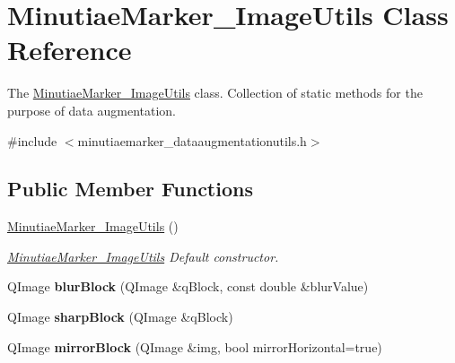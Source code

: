 \hypertarget{class_minutiae_marker___image_utils}{}\section{Minutiae\+Marker\+\_\+\+Image\+Utils Class Reference}
\label{class_minutiae_marker___image_utils}


The \mbox{\hyperlink{class_minutiae_marker___image_utils}{Minutiae\+Marker\+\_\+\+Image\+Utils}} class. Collection of static methods for the purpose of data augmentation.  




{\ttfamily \#include $<$minutiaemarker\+\_\+dataaugmentationutils.\+h$>$}

\subsection*{Public Member Functions}
\begin{DoxyCompactItemize}
\item 
\mbox{\label{class_minutiae_marker___image_utils_af13dada2f7014768d5d361371a8082f7}} 
\mbox{\hyperlink{class_minutiae_marker___image_utils_af13dada2f7014768d5d361371a8082f7}{Minutiae\+Marker\+\_\+\+Image\+Utils}} ()
\begin{DoxyCompactList}\small\item\em \mbox{\hyperlink{class_minutiae_marker___image_utils}{Minutiae\+Marker\+\_\+\+Image\+Utils}} Default constructor. \end{DoxyCompactList}\item 
\mbox{\label{class_minutiae_marker___image_utils_adc0e082f6567b6a538971a105aed639d}} 
Q\+Image {\bfseries blur\+Block} (Q\+Image \&q\+Block, const double \&blur\+Value)
\item 
\mbox{\label{class_minutiae_marker___image_utils_a78042341924f110c600c224eb98a226e}} 
Q\+Image {\bfseries sharp\+Block} (Q\+Image \&q\+Block)
\item 
\mbox{\label{class_minutiae_marker___image_utils_aefbe41399532d1ba65af4398c3645872}} 
Q\+Image {\bfseries mirror\+Block} (Q\+Image \&img, bool mirror\+Horizontal=true)
\end{DoxyCompactItemize}
